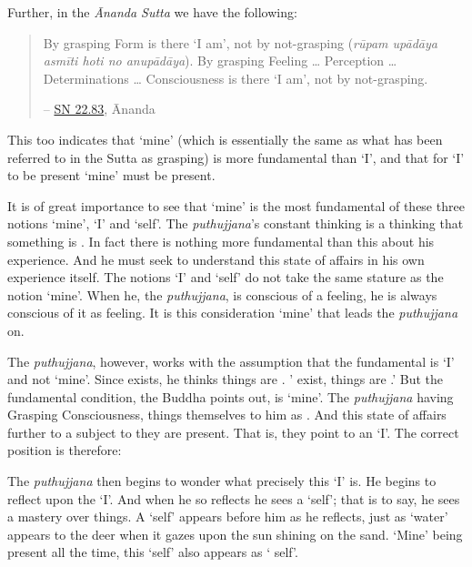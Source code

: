 Further, in the \emph{Ānanda Sutta} we have the following:

\begin{quote}
By grasping Form is there `I am', not by not-grasping (\emph{rūpam upādāya asmīti hoti no anupādāya}). By grasping Feeling \ldots{} Perception \ldots{} Determinations \ldots{} Consciousness is there `I am', not by not-grasping.

 -- \href{https://suttacentral.net/sn22.83/en/bodhi}{SN 22.83}, Ānanda
\end{quote}

This too indicates that `mine' (which is essentially the same as what has been referred to in the Sutta as grasping) is more fundamental than `I', and that for `I' to be present `mine' must be present.

It is of great  importance to see that `mine' is the most fundamental of these three notions `mine', `I' and `self'. The \emph{puthujjana}'s constant thinking is a thinking that something is . In fact there is nothing more fundamental than this about his experience. And he must seek to understand this state of affairs in his own experience itself. The notions `I' and `self' do not take the same stature as the notion `mine'. When he, the \emph{puthujjana}, is conscious of a feeling, he is always conscious of it as  feeling. It is this consideration `mine' that leads the \emph{puthujjana} on.

The \emph{puthujjana}, however, works with the assumption that the fundamental is `I' and not `mine'. Since  exists, he thinks things are . ' exist, things are .' But the fundamental condition, the Buddha points out, is `mine'. The \emph{puthujjana} having Grasping Consciousness, things  themselves to him as . And this state of affairs further  to a subject to  they are present. That is, they point to an `I'. The correct position is therefore: 

The \emph{puthujjana} then begins to wonder what precisely this `I' is. He begins to reflect upon the `I'. And when he so reflects he sees a `self'; that is to say, he sees a mastery over things. A `self' appears before him as he reflects, just as `water' appears to the deer when it gazes upon the sun shining on the sand. `Mine' being present all the time, this `self' also appears as ` self'.

